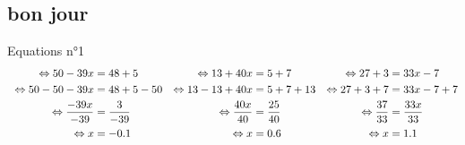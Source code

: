 \documentclass{article}%
\begin{document}
\subsection{bon jour}%
\label{subsec:bonjour}%
Equations n°1%
\begin{align*}%
\vspace{10mm}%
\newline%
\  \Leftrightarrow 50 - 39x &= 48 + 5     & \Leftrightarrow 13 + 40x  &= 5 + 7       & \Leftrightarrow 27 + 3 &= 33x - 7\\%
\vspace{5mm}%
\newline%
\  \Leftrightarrow 50 - 50 - 39x &= 48 + 5 -50      & \Leftrightarrow 13 - 13 + 40x  &= 5 + 7 + 13        & \Leftrightarrow 27 + 3 + 7 &= 33x - 7 +7\\%
\vspace{5mm}%
\newline%
\  \Leftrightarrow \frac{-39x}{-39} &= \frac{3}{-39}      & \Leftrightarrow \frac{40x}{40} &= \frac{25}{40}      & \Leftrightarrow \frac{37}{33} &= \frac{33x}{33}\\%
\vspace{5mm}%
\newline%
\  \Leftrightarrow  x &= -0.1      & \Leftrightarrow  x &= 0.6      & \Leftrightarrow  x &= 1.1\\%
\end{align*}

%
\newpage%
\end{document}
